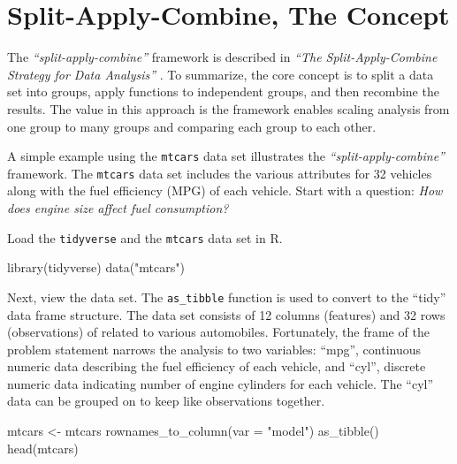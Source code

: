 \section{Split-Apply-Combine, The
Concept}\label{split-apply-combine-the-concept}

The \emph{``split-apply-combine''} framework is described in \emph{``The
Split-Apply-Combine Strategy for Data Analysis''} \citep{plyr}. To
summarize, the core concept is to split a data set into groups, apply
functions to independent groups, and then recombine the results. The
value in this approach is the framework enables scaling analysis from
one group to many groups and comparing each group to each other.

A simple example using the \texttt{mtcars} data set illustrates the
\emph{``split-apply-combine''} framework. The \texttt{mtcars} data set
includes the various attributes for 32 vehicles along with the fuel
efficiency (MPG) of each vehicle. Start with a question: \emph{How does
engine size affect fuel consumption?}

Load the \texttt{tidyverse} and the \texttt{mtcars} data set in R.

\begin{Schunk}
\begin{Sinput}
library(tidyverse)
data("mtcars")
\end{Sinput}
\end{Schunk}

Next, view the data set. The \texttt{as\_tibble} function is used to
convert to the ``tidy'' data frame structure. The data set consists of
12 columns (features) and 32 rows (observations) of related to various
automobiles. Fortunately, the frame of the problem statement narrows the
analysis to two variables: ``mpg'', continuous numeric data describing
the fuel efficiency of each vehicle, and ``cyl'', discrete numeric data
indicating number of engine cylinders for each vehicle. The ``cyl'' data
can be grouped on to keep like observations together.

\begin{Schunk}
\begin{Sinput}
mtcars <- mtcars %
    rownames_to_column(var = "model") %
    as_tibble()
head(mtcars)
\end{Sinput}
\end{Schunk}

